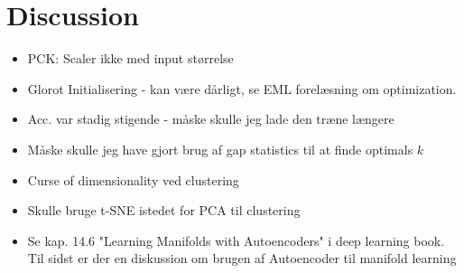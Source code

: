 \documentclass[./main.tex]{subfiles}
\begin{document}
\section{Discussion}
\begin{itemize}
    \item PCK: Scaler ikke med input størrelse
    \item Glorot Initialisering - kan være dårligt, se EML forelæsning om optimization.
    \item Acc. var stadig stigende - måske skulle jeg lade den træne længere
    \item Måske skulle jeg have gjort brug af gap statistics til at finde optimals $k$
    \item Curse of dimensionality ved clustering
    \item Skulle bruge t-SNE istedet for PCA til clustering
    \item Se kap. 14.6 "Learning Manifolds with Autoencoders" i deep learning book. Til sidst er der en diskussion om brugen af Autoencoder til manifold learning
\end{itemize}
\end{document}
